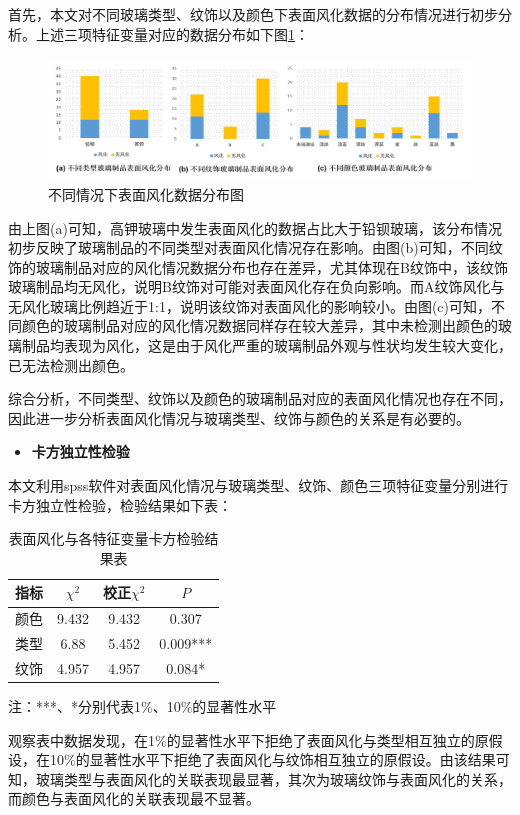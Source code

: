 \documentclass[withoutpreface,bwprint]{cumcmthesis} %
\begin{document}
首先，本文对不同玻璃类型、纹饰以及颜色下表面风化数据的分布情况进行初步分析。上述三项特征变量对应的数据分布如下图\ref{fenbu}：

\begin{figure}[H]
\centering
\includegraphics[width=1.05\textwidth]{figure/分布}
\caption{不同情况下表面风化数据分布图}
\label{fenbu}
\end{figure}

由上图(a)可知，高钾玻璃中发生表面风化的数据占比大于铅钡玻璃，该分布情况初步反映了玻璃制品的不同类型对表面风化情况存在影响。由图(b)可知，不同纹饰的玻璃制品对应的风化情况数据分布也存在差异，尤其体现在B纹饰中，该纹饰玻璃制品均无风化，说明B纹饰对可能对表面风化存在负向影响。而A纹饰风化与无风化玻璃比例趋近于1:1，说明该纹饰对表面风化的影响较小。由图(c)可知，不同颜色的玻璃制品对应的风化情况数据同样存在较大差异，其中未检测出颜色的玻璃制品均表现为风化，这是由于风化严重的玻璃制品外观与性状均发生较大变化，已无法检测出颜色。

综合分析，不同类型、纹饰以及颜色的玻璃制品对应的表面风化情况也存在不同，因此进一步分析表面风化情况与玻璃类型、纹饰与颜色的关系是有必要的。

\begin{itemize}
	\item \textbf{卡方独立性检验}
\end{itemize}

本文利用spss软件对表面风化情况与玻璃类型、纹饰、颜色三项特征变量分别进行卡方独立性检验，检验结果如下表：
\begin{table}[H]
\centering
\caption{表面风化与各特征变量卡方检验结果表}
\begin{threeparttable} 
\begin{tabular}{cccc}
\toprule[1.5pt]
指标 & $\chi^{2}$    & 校正$\chi^{2}$  & $P$        \\ \hline
颜色 & 9.432 & 9.432 & 0.307    \\
类型 & 6.88  & 5.452 & 0.009*** \\
纹饰 & 4.957 & 4.957 & 0.084*   \\ \bottomrule[1.5pt]
\end{tabular}
\begin{tablenotes}
        \footnotesize
        \item 注：***、*分别代表1$\%$、10$\%$的显著性水平
      \end{tablenotes}
  \end{threeparttable}
\end{table}
观察表中数据发现，在1$\%$的显著性水平下拒绝了表面风化与类型相互独立的原假设，在10$\%$的显著性水平下拒绝了表面风化与纹饰相互独立的原假设。由该结果可知，玻璃类型与表面风化的关联表现最显著，其次为玻璃纹饰与表面风化的关系，而颜色与表面风化的关联表现最不显著。
\end{document}
